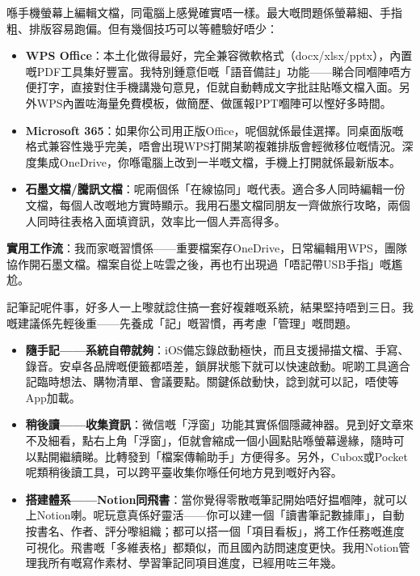 


喺手機螢幕上編輯文檔，同電腦上感覺確實唔一樣。最大嘅問題係螢幕細、手指粗、排版容易跑偏。但有幾個技巧可以等體驗好唔少：

\begin{itemize}
  \item \textbf{WPS Office}：本土化做得最好，完全兼容微軟格式（docx/xlsx/pptx），內置嘅PDF工具集好豐富。我特別鍾意佢嘅「語音備註」功能——睇合同嗰陣唔方便打字，直接對住手機講幾句意見，佢就自動轉成文字批註貼喺文檔入面。另外WPS內置咗海量免費模板，做簡歷、做匯報PPT嗰陣可以慳好多時間。
  \item \textbf{Microsoft 365}：如果你公司用正版Office，呢個就係最佳選擇。同桌面版嘅格式兼容性幾乎完美，唔會出現WPS打開某啲複雜排版會輕微移位嘅情況。深度集成OneDrive，你喺電腦上改到一半嘅文檔，手機上打開就係最新版本。
  \item \textbf{石墨文檔/騰訊文檔}：呢兩個係「在線協同」嘅代表。適合多人同時編輯一份文檔，每個人改嘅地方實時顯示。我用石墨文檔同朋友一齊做旅行攻略，兩個人同時往表格入面填資訊，效率比一個人弄高得多。
\end{itemize}

\textbf{實用工作流}：我而家嘅習慣係——重要檔案存OneDrive，日常編輯用WPS，團隊協作開石墨文檔。檔案自從上咗雲之後，再也冇出現過「唔記帶USB手指」嘅尷尬。


記筆記呢件事，好多人一上嚟就諗住搞一套好複雜嘅系統，結果堅持唔到三日。我嘅建議係先輕後重——先養成「記」嘅習慣，再考慮「管理」嘅問題。

\begin{itemize}
  \item \textbf{隨手記——系統自帶就夠}：iOS備忘錄啟動極快，而且支援掃描文檔、手寫、錄音。安卓各品牌嘅便籤都唔差，鎖屏狀態下就可以快速啟動。呢啲工具適合記臨時想法、購物清單、會議要點。關鍵係啟動快，諗到就可以記，唔使等App加載。
  \item \textbf{稍後讀——收集資訊}：微信嘅「浮窗」功能其實係個隱藏神器。見到好文章來不及細看，點右上角「浮窗」，佢就會縮成一個小圓點貼喺螢幕邊緣，隨時可以點開繼續睇。比轉發到「檔案傳輸助手」方便得多。另外，Cubox或Pocket呢類稍後讀工具，可以跨平臺收集你喺任何地方見到嘅好內容。
  \item \textbf{搭建體系——Notion同飛書}：當你覺得零散嘅筆記開始唔好揾嗰陣，就可以上Notion喇。呢玩意真係好靈活——你可以建一個「讀書筆記數據庫」，自動按書名、作者、評分嚟組織；都可以搭一個「項目看板」，將工作任務嘅進度可視化。飛書嘅「多維表格」都類似，而且國內訪問速度更快。我用Notion管理我所有嘅寫作素材、學習筆記同項目進度，已經用咗三年幾。
\end{itemize}

